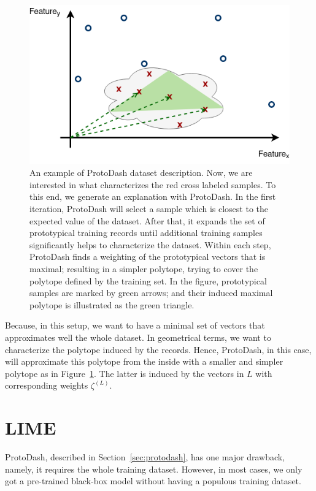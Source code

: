 \documentclass[output=paper,colorlinks,citecolor=brown
]{langscibook}
\begin{document}
\begin{figure}[h!]
    \includegraphics[width=.85\textwidth]{protodash2.png}
    \caption{An example of ProtoDash dataset description. Now, we are interested in what characterizes the red cross labeled samples. To this end, we generate an explanation with ProtoDash. In the first iteration, ProtoDash will select a sample which is closest to the expected value of the dataset. After that, it expands the set of prototypical training records until additional training samples significantly helps to characterize the dataset. Within each step, ProtoDash finds a weighting of the prototypical vectors that is maximal; resulting in a simpler polytope, trying to cover the polytope defined by the training set. In the figure, prototypical samples are marked by green arrows; and their induced maximal polytope is illustrated as the green triangle.}
    \label{fig:proto2}
\end{figure}

Because, in this setup, we want to have a minimal set of vectors that approximates well the whole dataset. In geometrical terms, we want to characterize the polytope induced by the records. Hence, ProtoDash, in this case, will approximate this polytope from the inside with a smaller and simpler polytope as in Figure~\ref{fig:proto2}. The latter is induced by the vectors in $L$ with corresponding weights $\zeta^{(L)}$.

\section{LIME}

ProtoDash, described in Section~\ref{sec:protodash}, has one major drawback, namely, it requires the whole training dataset. However, in most cases, we only got a pre-trained black-box model without having a populous training dataset.
\end{document}
